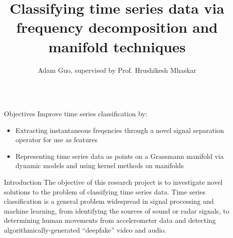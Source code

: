 \documentclass[final]{beamer}
\title{Classifying time series data via frequency decomposition and manifold techniques} %
\author{Adam Guo, supervised by Prof. Hrushikesh Mhaskar} %
\institute{Pomona College ('22), Claremont Graduate University} %
\newlength{\sepwid}
\newlength{\onecolwid}
\begin{document}

\setlength{\belowcaptionskip}{2ex} %
\setlength\belowdisplayshortskip{2ex} %

\begin{frame}[t] %

\begin{columns}[t] %

\begin{column}{\sepwid}\end{column} %

\begin{column}{\onecolwid} %


\begin{alertblock}{Objectives}
    Improve time series classification by:

    \begin{itemize}
        \item Extracting instantaneous freqencies through a novel signal separation operator for use
            as features
        \item Representing time series data as points on a Grassmann manifold via dynamic models and
            using kernel methods on manifolds
    \end{itemize}
\end{alertblock}


\begin{block}{Introduction}
    The objective of this research project is to investigate novel solutions to the problem of
    classifying time series data. Time series classification is a general problem widespread in
    signal processing and machine learning, from identifying the sources of sound or radar signals,
    to determining human movements from accelerometer data and detecting algorithmically-generated
    ``deepfake'' video and audio.


\end{block}
\end{column}
\end{columns}
\end{frame}
\end{document}
